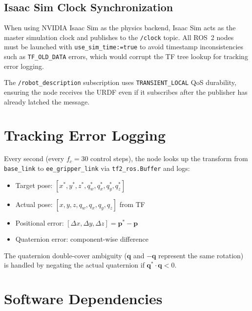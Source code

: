 \documentclass[12pt, a4paper]{article}
\begin{document}
\subsection{Isaac Sim Clock Synchronization}
\label{ssec:simtime}

When using NVIDIA Isaac Sim as the physics backend, Isaac Sim acts as the master
simulation clock and publishes to the \texttt{/clock} topic. All ROS~2 nodes must
be launched with \texttt{use\_sim_time:=true} to avoid timestamp inconsistencies
such as \texttt{TF\_OLD\_DATA} errors, which would corrupt the TF tree lookup for
tracking error logging.

The \texttt{/robot\_description} subscription uses \texttt{TRANSIENT\_LOCAL} QoS
durability, ensuring the node receives the URDF even if it subscribes after the
publisher has already latched the message.

\section{Tracking Error Logging}
\label{sec:tracking}

Every second (every $f_c = 30$ control steps), the node looks up the transform from
\texttt{base\_link} to \texttt{ee\_gripper\_link} via \texttt{tf2\_ros.Buffer} and
logs:

\begin{itemize}[nosep]
  \item Target pose: $[x^*, y^*, z^*, q^*_w, q^*_x, q^*_y, q^*_z]$
  \item Actual pose: $[x, y, z, q_w, q_x, q_y, q_z]$ from TF
  \item Positional error: $[\Delta x, \Delta y, \Delta z] = \mathbf{p}^* - \mathbf{p}$
  \item Quaternion error: component-wise difference
\end{itemize}

The quaternion double-cover ambiguity ($\mathbf{q}$ and $-\mathbf{q}$ represent
the same rotation) is handled by negating the actual quaternion if
$\mathbf{q}^* \cdot \mathbf{q} < 0$.

\section{Software Dependencies}
\label{sec:deps}
\end{document}
